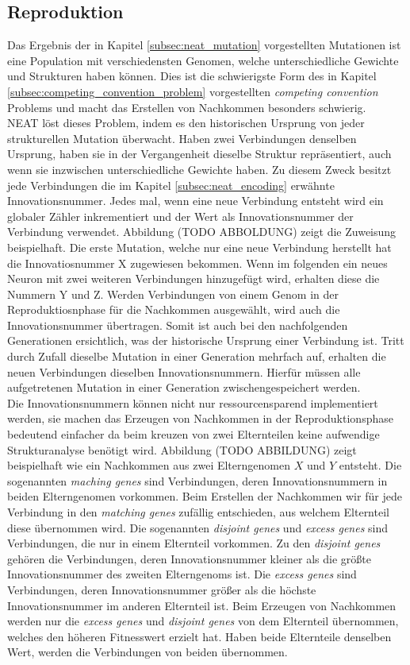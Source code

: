 \subsection{Reproduktion}
\label{subsec:neat_reproduction}
Das Ergebnis der in Kapitel \ref{subsec:neat_mutation} vorgestellten Mutationen ist eine Population mit verschiedensten Genomen, welche unterschiedliche Gewichte und Strukturen haben können. Dies ist die schwierigste Form des in Kapitel \ref{subsec:competing_convention_problem} vorgestellten \emph{competing convention} Problems und macht das Erstellen von Nachkommen besonders schwierig.\\
\ac{NEAT} löst dieses Problem, indem es den historischen Ursprung von jeder strukturellen Mutation überwacht. Haben zwei Verbindungen denselben Ursprung, haben sie in der Vergangenheit dieselbe Struktur repräsentiert, auch wenn sie inzwischen unterschiedliche Gewichte haben. Zu diesem Zweck besitzt jede Verbindungen die im Kapitel \ref{subsec:neat_encoding} erwähnte Innovationsnummer. Jedes mal, wenn eine neue Verbindung entsteht wird ein globaler Zähler inkrementiert und der Wert als Innovationsnummer der Verbindung verwendet. Abbildung (TODO ABBOLDUNG) zeigt die Zuweisung beispielhaft. Die erste Mutation, welche nur eine neue Verbindung herstellt hat die Innovatiosnummer X zugewiesen bekommen. Wenn im folgenden ein neues Neuron mit zwei weiteren Verbindungen hinzugefügt wird, erhalten diese die Nummern Y und Z. Werden Verbindungen von einem Genom in der Reproduktiosnphase für die Nachkommen ausgewählt, wird auch die Innovationsnummer übertragen. Somit ist auch bei den nachfolgenden Generationen ersichtlich, was der historische Ursprung einer Verbindung ist. Tritt durch Zufall dieselbe Mutation in einer Generation mehrfach auf, erhalten die neuen Verbindungen dieselben Innovationsnummern. Hierfür müssen alle aufgetretenen Mutation in einer Generation zwischengespeichert werden. \\
Die Innovationsnummern können nicht nur ressourcensparend implementiert werden, sie machen das Erzeugen von Nachkommen in der Reproduktionsphase bedeutend einfacher da beim kreuzen von zwei Elternteilen keine aufwendige Strukturanalyse benötigt wird. Abbildung (TODO ABBILDUNG) zeigt beispielhaft wie ein Nachkommen aus zwei Elterngenomen $X$ und $Y$ entsteht. Die sogenannten \emph{maching genes} sind Verbindungen, deren Innovationsnummern in beiden Elterngenomen vorkommen. Beim Erstellen der Nachkommen wir für jede Verbindung in den \emph{matching genes} zufällig entschieden, aus welchem Elternteil diese übernommen wird. Die sogenannten \emph{disjoint genes} und \emph{excess genes} sind Verbindungen, die nur in einem Elternteil vorkommen. Zu den \emph{disjoint genes} gehören die Verbindungen, deren Innovationsnummer kleiner als die größte Innovationsnummer des zweiten Elterngenoms ist. Die \emph{excess genes} sind Verbindungen, deren Innovationsnummer größer als die höchste Innovationsnummer im anderen Elternteil ist. Beim Erzeugen von Nachkommen werden nur die \emph{excess genes} und \emph{disjoint genes} von dem Elternteil übernommen, welches den höheren Fitnesswert erzielt hat. Haben beide Elternteile denselben Wert, werden die Verbindungen von beiden übernommen.
